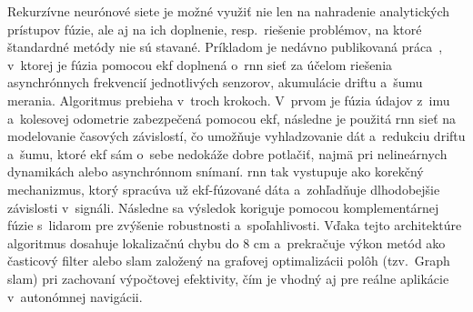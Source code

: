     Rekurzívne neurónové siete je možné využiť nie len na nahradenie analytických prístupov fúzie, ale aj na ich doplnenie, resp.\ riešenie problémov, na ktoré štandardné metódy nie sú stavané. Príkladom je nedávno publikovaná práca~\cite{huangApplicationMultisensorFusion2025a}, v~ktorej je fúzia pomocou \acrshort{ekf} doplnená o~\acrshort{rnn} sieť za účelom riešenia asynchrónnych frekvencií jednotlivých senzorov, akumulácie driftu a~šumu merania. Algoritmus prebieha v~troch krokoch. V~prvom je fúzia údajov z~\acrshort{imu} a~kolesovej odometrie zabezpečená pomocou \acrshort{ekf}, následne je použitá \acrshort{rnn} sieť na modelovanie časových závislostí, čo umožňuje vyhladzovanie dát a~redukciu driftu a~šumu, ktoré \acrshort{ekf} sám o~sebe nedokáže dobre potlačiť, najmä pri nelineárnych dynamikách alebo asynchrónnom snímaní\@. \acrshort{rnn} tak vystupuje ako korekčný mechanizmus, ktorý spracúva už \acrshort{ekf}-fúzované dáta a~zohľadňuje dlhodobejšie závislosti v~signáli. Následne sa výsledok koriguje pomocou komplementárnej fúzie s~lidarom pre zvýšenie robustnosti a~spoľahlivosti. Vďaka tejto architektúre algoritmus dosahuje lokalizačnú chybu do 8 cm a~prekračuje výkon metód ako časticový filter alebo \acrshort{slam} založený na grafovej optimalizácii polôh (tzv.\ Graph \acrshort{slam}) pri zachovaní výpočtovej efektivity, čím je vhodný aj pre reálne aplikácie v~autonómnej navigácii.